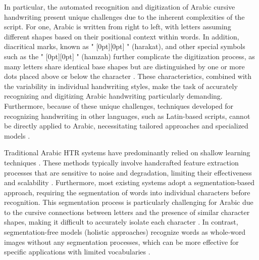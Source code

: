 \documentclass[conference]{IEEEtran}
\newcommand{\artext}[1]{%
  {\fontsize{8pt}{11pt}\selectfont \raisebox{0pt}[0pt][0pt]{\RL{#1}}}%
}
\begin{document}
In particular, the automated recognition and digitization of Arabic cursive handwriting present unique challenges due to the inherent complexities of the script. For one, Arabic is written from right to left, with letters assuming different shapes based on their positional context within words. In addition, diacritical marks, known as "\artext{حركات}" (harakat), and other special symbols such as the "\artext{همزة}" (hamzah) further complicate the digitization process, as many letters share identical base shapes but are distinguished by one or more dots placed above or below the character \cite{el1990arabic}. These characteristics, combined with the variability in individual handwriting styles, make the task of accurately recognizing and digitizing Arabic handwriting particularly demanding. Furthermore, because of these unique challenges, techniques developed for recognizing handwriting in other languages, such as Latin-based scripts, cannot be directly applied to Arabic, necessitating tailored approaches and specialized models \cite{alrobah2022arabic}.

Traditional Arabic HTR systems have predominantly relied on shallow learning techniques \cite{mutawa2024machine}. These methods typically involve handcrafted feature extraction processes that are sensitive to noise and degradation, limiting their effectiveness and scalability \cite{parvez2013offline}. Furthermore, most existing systems adopt a segmentation-based approach, requiring the segmentation of words into individual characters before recognition. This segmentation process is particularly challenging for Arabic due to the cursive connections between letters and the presence of similar character shapes, making it difficult to accurately isolate each character \cite{faizullah2023survey, mezghani2023recent}. In contrast, segmentation-free models (holistic approaches) recognize words as whole-word images without any segmentation processes, which can be more effective for specific applications with limited vocabularies \cite{alkhateeb2009component, nashwan2017holistic}.
\end{document}
